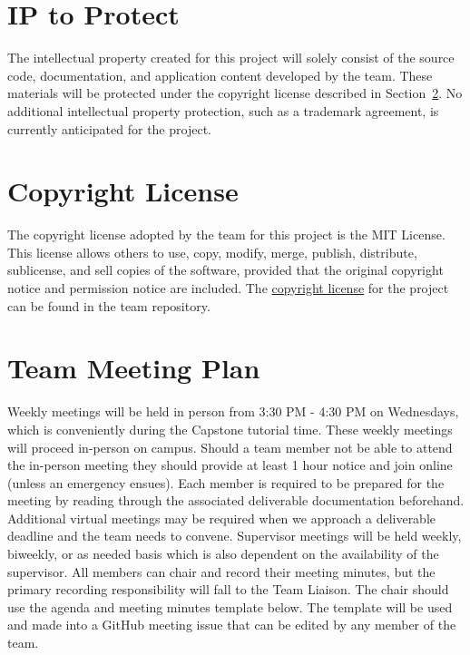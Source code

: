 \documentclass{article}
\begin{document}
\section{IP to Protect}

The intellectual property created for this project will solely consist of the source code,
documentation, and application content developed by the team. These materials will be
protected under the copyright license described in Section~\ref{sec:copyright-license}.
No additional intellectual property protection, such as a trademark agreement, is
currently anticipated for the project.

\section{Copyright License}
\label{sec:copyright-license}

The copyright license adopted by the team for this project is the MIT License.
This license allows others to use, copy, modify, merge, publish, distribute, sublicense,
and sell copies of the software, provided that the original copyright notice and permission
notice are included. The \href{https://github.com/team-hindsight/ophthamology-game/blob/main/LICENSE}{copyright license}
for the project can be found in the team repository.

\section{Team Meeting Plan}

Weekly meetings will be held in person from 3:30 PM - 4:30 PM on Wednesdays, which 
is conveniently during the Capstone tutorial time. These weekly meetings will 
proceed in-person on campus. Should a 
team member not be able to attend the in-person meeting they should provide at least 
1 hour notice and join online (unless an emergency ensues). Each member is required 
to be prepared for the meeting by reading through the associated deliverable 
documentation beforehand. Additional virtual meetings may be required when we approach 
a deliverable deadline and the team needs to convene. Supervisor meetings will be 
held weekly, biweekly, or as needed basis which is also dependent on the availability 
of the supervisor. All members can chair and record their meeting minutes, but the 
primary recording responsibility will fall to the Team Liaison. The chair should use 
the agenda and meeting minutes template below. The template will be used and made into 
a GitHub meeting issue that can be edited by any member of the team.
\end{document}
